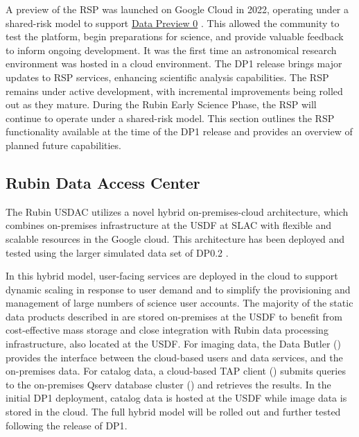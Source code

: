 A preview of the \gls{RSP} was launched on Google Cloud in 2022, operating under a shared-risk model to support \href{https://dp0.lsst.io/}{Data Preview 0} \citep{2024ASPC..535..227O}. This allowed the community to test the platform, begin preparations  for science, and provide valuable feedback to inform ongoing development.
It was the first time an astronomical research environment was hosted in a \gls{cloud} environment.
The DP1 release brings major updates to \gls{RSP} services, enhancing scientific analysis capabilities.
The \gls{RSP} remains under active development, with incremental improvements being rolled out as they mature.
During the Rubin Early Science Phase, the \gls{RSP} will continue to operate under a shared-risk model.
This section outlines the RSP functionality available at the time of the DP1 release and provides an overview of planned future capabilities.

\subsection{Rubin Data Access Center
\label{ssec:usdac}}
The Rubin USDAC utilizes a novel hybrid on-premises-\gls{cloud} architecture, which combines on-premises infrastructure at the \gls{USDF} at SLAC with flexible and scalable resources in the Google \gls{cloud}.
This architecture has been deployed and tested using the larger simulated data set of DP0.2 \citep{2024SPIE13101E..2BO}.

In this hybrid model, user-facing services are deployed in the \gls{cloud} to support
dynamic scaling in response to user demand and to simplify the provisioning and management of large numbers of science user accounts.
The majority of the static data products described in  are stored on-premises at the \gls{USDF} to benefit from cost-effective mass storage and close integration with Rubin data processing infrastructure, also located at the \gls{USDF}.
For imaging data, the Data Butler () provides the interface between the \gls{cloud}-based users and data services, and the on-premises data.
For catalog data, a \gls{cloud}-based \gls{TAP} client () submits queries to the on-premises \gls{Qserv} database cluster () and retrieves the results.
In the initial DP1 deployment, catalog data is hosted at the \gls{USDF} while image data is stored in the cloud.
The full hybrid model will be rolled out and further tested following the release of \gls{DP1}.

